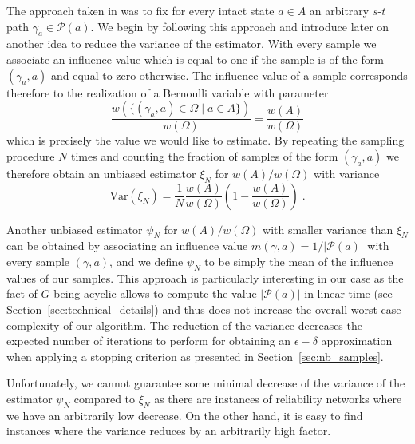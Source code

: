 \documentclass{article}
\newcommand\var{\mathrm{Var}}
\begin{document}
The approach taken in \cite{karp_1985_montecarlo} was to fix for every intact
state $a\in A$ an arbitrary $s$-$t$ path $\gamma_a\in
\mathcal{P}(a)$. We begin by following this approach and
introduce later on another idea to reduce the
variance of the estimator. With every sample we associate an
influence value which
is equal to one if the sample is of the form $(\gamma_a,a)$
and equal to zero otherwise. The influence value of a sample
corresponds therefore
to the realization of a Bernoulli variable with parameter
\begin{equation*}
\frac{w(\{(\gamma_a,a) \in \Omega \mid a\in A\})}{w(\Omega)}=\frac{w(A)}{w(\Omega)}
\end{equation*}
which is precisely the value we would like to estimate. By repeating the sampling procedure
$N$ times and counting the fraction of samples of the
form $(\gamma_a,a)$ we therefore obtain an unbiased estimator $\xi_N$
for $w(A)/w(\Omega)$ with variance
\begin{equation*}
\var(\xi_N)=\frac{1}{N}\frac{w(A)}{w(\Omega)}\left(1-\frac{w(A)}{w(\Omega)}\right)\;.
\end{equation*}

Another unbiased estimator $\psi_N$ for $w(A)/w(\Omega)$
with smaller variance than $\xi_N$ can be
obtained by associating an influence value
$m(\gamma,a)=1/|\mathcal{P}(a)|$ with every sample
$(\gamma,a)$, and we define
$\psi_N$ to be simply the mean of the influence values
of our samples. This
approach is particularly interesting in our case as the fact
of $G$ being acyclic allows to compute the value
$|\mathcal{P}(a)|$ in linear time (see Section~\ref{sec:technical_details})
and thus does not increase the overall worst-case complexity of our
algorithm. The reduction of the variance decreases the expected number
of iterations to perform for obtaining an $\epsilon-\delta$ approximation
when applying a stopping criterion as presented in
Section~\ref{sec:nb_samples}.

Unfortunately, we cannot guarantee some minimal decrease of the variance
of the estimator $\psi_N$ compared to $\xi_N$ as there are instances
of reliability networks where we have an arbitrarily low decrease.
On the other hand, it is easy to find instances where the variance
reduces by an arbitrarily high factor.
\end{document}
